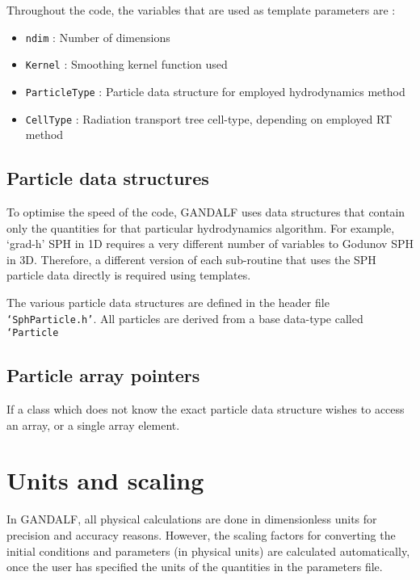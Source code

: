\documentclass[a4paper]{article}
\newcommand{\var}[1]{\texttt{#1}}
\begin{document}
Throughout the code, the variables that are used as template parameters are :
\begin{itemize}
\item \var{ndim} : Number of dimensions
\item \var{Kernel} : Smoothing kernel function used
\item \var{ParticleType} : Particle data structure for employed hydrodynamics method
\item \var{CellType} : Radiation transport tree cell-type, depending on employed RT method
\end{itemize}


\subsection{Particle data structures}

To optimise the speed of the code, GANDALF uses data structures that contain only the quantities for that particular hydrodynamics algorithm.  For example, `grad-h' SPH in 1D requires a very different number of variables to Godunov SPH in 3D.  Therefore, a different version of each sub-routine that uses the SPH particle data directly is required using templates.

The various particle data structures are defined in the header file \var{`SphParticle.h'}.  All particles are derived from a base data-type called \var{`Particle}




\subsection{Particle array pointers}

If a class which does not know the exact particle data structure wishes to access an array, or a single array element.


\newpage


\section{Units and scaling}
In GANDALF, all physical calculations are done in dimensionless units for precision and accuracy reasons.  However, the scaling factors for converting the initial conditions and parameters (in physical units) are calculated automatically, once the user has specified the units of the quantities in the parameters file.
\end{document}
